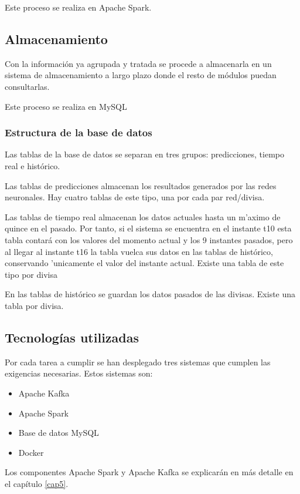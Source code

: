 Este proceso se realiza en Apache Spark.



\subsection{Almacenamiento}
Con la información ya agrupada y tratada se procede a almacenarla en un sistema de almacenamiento a largo plazo donde el resto de módulos puedan consultarlas. 

Este proceso se realiza en MySQL

\subsubsection{Estructura de la base de datos}
Las tablas de la base de datos se separan en tres grupos: predicciones, tiempo real e histórico.

Las tablas de predicciones almacenan los resultados generados por las redes neuronales. Hay cuatro tablas de este tipo, una por cada par red/divisa.

Las tablas de tiempo real almacenan los datos actuales hasta un m'aximo de quince en el pasado. Por tanto, si el sistema se encuentra en el instante t10 esta tabla contará con los valores del momento actual y los 9 instantes pasados, pero al llegar al instante t16 la tabla vuelca sus datos en las tablas de histórico, conservando 'unicamente el valor del instante actual. Existe una tabla de este tipo por divisa

En las tablas de histórico se guardan los datos pasados de las divisas. Existe una tabla por divisa.



\subsection{Tecnologías utilizadas}
Por cada tarea a cumplir se han desplegado tres sistemas que cumplen las exigencias necesarias. Estos sistemas son:
\begin{itemize}
\item Apache Kafka
\item Apache Spark
\item Base de datos MySQL
\item Docker
\end{itemize}

Los componentes Apache Spark y Apache Kafka se explicarán en más detalle en el capítulo \ref{cap5}.

